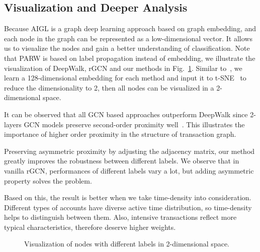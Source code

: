 \subsection{Visualization and Deeper Analysis}
Because AIGL is a graph deep learning approach based on graph embedding, and each node in the graph can be represented as a low-dimensional vector. It allows us to visualize the nodes and gain a better understanding of classification. Note that PARW is based on label propagation instead of embedding, we illustrate the visualization of DeepWalk, rGCN and our methods in Fig.~\ref{fig:visualization}. Similar to~\cite{wang2016structural}, we learn a 128-dimensional embedding for each method and input it to t-SNE~\cite{maaten2008visualizing} to reduce the dimensionality to 2, then all nodes can be visualized in a 2-dimensional space.

It can be observed that all GCN based approaches outperform DeepWalk since 2-layers GCN models preserve second-order proximity well~\cite{goyal2018graph}. This illustrates the importance of higher order proximity in the structure of transaction graph.

Preserving asymmetric proximity by adjusting the adjacency matrix, our method greatly improves the robustness between different labels. We observe that in vanilla rGCN, performances of different labels vary a lot, but adding asymmetric property solves the problem. %

Based on this, the result is better when we take time-density into consideration. Different types of accounts have diverse active time distribution, so time-density helps to distinguish between them. Also, intensive transactions reflect more typical characteristics, therefore deserve higher weights.
 
\begin{figure}
\centering     %
{}

\caption{Visualization of nodes with different labels in 2-dimensional space.}
\label{fig:visualization}
\end{figure}


